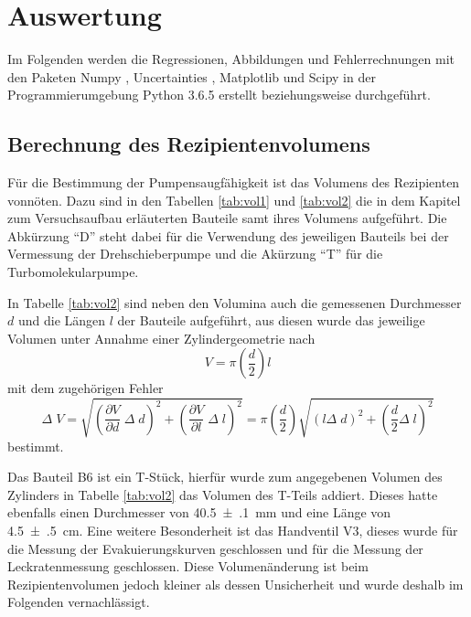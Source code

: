 \newpage
\section{Auswertung}
\label{sec:Auswertung}

Im Folgenden werden die Regressionen, Abbildungen und Fehlerrechnungen mit den
Paketen Numpy \cite{numpy}, Uncertainties \cite{uncertainties}, Matplotlib
\cite{matplotlib} und Scipy \cite{scipy} in der Programmierumgebung
Python 3.6.5 erstellt beziehungsweise durchgeführt.

\subsection{Berechnung des Rezipientenvolumens}
\label{sec:Volumina}

Für die Bestimmung der Pumpensaugfähigkeit ist das Volumens des Rezipienten
vonnöten. Dazu sind in den Tabellen \ref{tab:vol1} und \ref{tab:vol2} die
in dem Kapitel zum Versuchsaufbau erläuterten Bauteile samt ihres Volumens aufgeführt.
Die Abkürzung \enquote{D} steht dabei für die Verwendung
des jeweiligen Bauteils bei der Vermessung der
Drehschieberpumpe und die Akürzung \enquote{T} für die Turbomolekularpumpe.



In Tabelle \ref{tab:vol2} sind neben den Volumina auch die gemessenen
Durchmesser $d$ und die Längen $l$ der Bauteile aufgeführt, aus diesen wurde
das jeweilige Volumen unter Annahme einer Zylindergeometrie nach
\begin{equation*}
  V = \pi \left(\frac{d}{2}\right) l
\end{equation*}
mit dem zugehörigen Fehler
\begin{equation*}
  \Delta \; V =
  \sqrt{\left(\frac{\partial V}{\partial d} \;\Delta \; d\right)^2 +
  \left(\frac{\partial V}{\partial l} \;\Delta \; l\right)^2} =
  \pi \left(\frac{d}{2}\right) \sqrt{
  \left(l \Delta \; d \right)^2 +
  \left( \frac{d}{2} \Delta \; l\right)^2}
\end{equation*}
bestimmt.



Das Bauteil B6 ist ein T-Stück, hierfür wurde zum angegebenen Volumen des Zylinders
in Tabelle \ref{tab:vol2}
das Volumen des T-Teils addiert. Dieses hatte ebenfalls einen Durchmesser
von \SI{40.5(1)}{\milli\meter} und eine Länge von \SI{4.5(5)}{\centi\meter}.
Eine weitere Besonderheit ist das Handventil V3, dieses wurde für die Messung
der Evakuierungskurven geschlossen und für die Messung der Leckratenmessung
geschlossen. Diese Volumenänderung ist beim Rezipientenvolumen jedoch kleiner
als dessen Unsicherheit und
wurde deshalb im Folgenden vernachlässigt.

